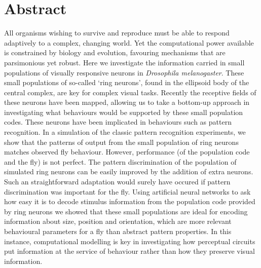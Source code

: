 \section{Abstract}
All organisms wishing to survive and reproduce must be able to respond adaptively to a complex, changing world.
Yet the computational power available is constrained by biology and evolution, favouring mechanisms that are parsimonious yet robust.
Here we investigate the information carried in small populations of visually responsive neurons in \emph{Drosophila melanogaster}.
These small populations of so-called `ring neurons', found in the ellipsoid body of the central complex, are key for complex visual tasks.
Recently the receptive fields of these neurons have been mapped, allowing us to take a bottom-up approach in investigating what behaviours would be supported by these small population codes. These neurons have been implicated in behaviours such as pattern recognition. In a simulation of the classic pattern recognition experiments, we show that the patterns of output from the small population of ring neurons matches observed fly behaviour. However, performance (of the population code and the fly) is not perfect. The pattern discrimination of the population of simulated ring neurons can be easily improved by the addition of extra neurons. Such an straightforward adaptation would surely have occured if pattern discrimination was important for the fly. Using artificial neural networks to ask how easy it is to decode stimulus information from the population code provided by ring neurons we showed that these small populations are ideal for encoding information about size, position and orientation, which are more relevant behavioural parameters for a fly than abstract pattern properties. In this instance, computational modelling is key in investigating how perceptual circuits put information at the service of behaviour rather than how they preserve visual information.
